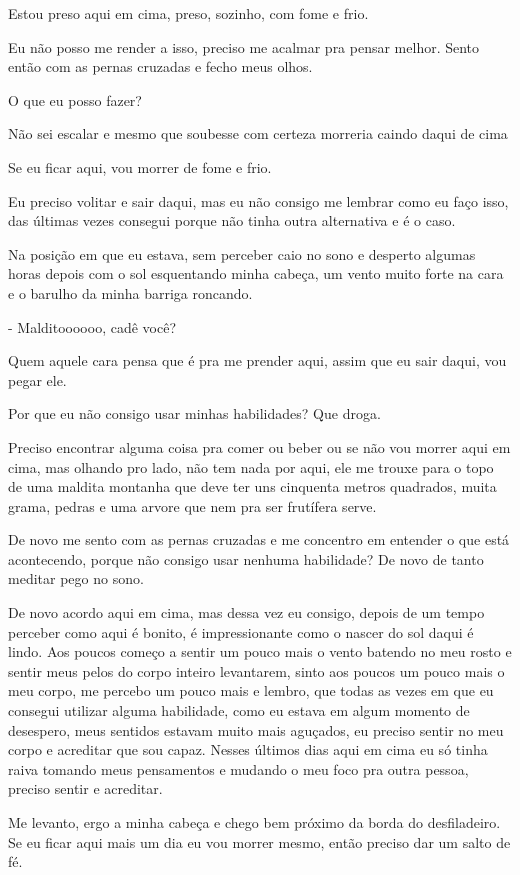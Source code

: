 Estou preso aqui em cima, preso, sozinho, com fome e frio.

Eu não posso me render a isso, preciso me acalmar pra pensar melhor. Sento então com as pernas cruzadas e fecho meus olhos. 

O que eu posso fazer? 

Não sei escalar e mesmo que soubesse com certeza morreria caindo daqui de cima

Se eu ficar aqui, vou morrer de fome e frio.

Eu preciso volitar e sair daqui, mas eu não consigo me lembrar como eu faço isso, das últimas vezes consegui porque não tinha outra alternativa e é o caso.

Na posição em que eu estava, sem perceber caio no sono e desperto algumas horas depois com o sol esquentando minha cabeça, um vento muito forte na cara e o barulho da minha barriga roncando.

- Malditoooooo, cadê você?

Quem aquele cara pensa que é pra me prender aqui, assim que eu sair daqui, vou pegar ele.

Por que eu não consigo usar minhas habilidades? Que droga.

Preciso encontrar alguma coisa pra comer ou beber ou se não vou morrer aqui em cima, mas olhando pro lado, não tem nada por aqui, ele me trouxe para o topo de uma maldita montanha que deve ter uns cinquenta metros quadrados, muita grama, pedras e uma arvore que nem pra ser frutífera serve.

De novo me sento com as pernas cruzadas e me concentro em entender o que está acontecendo, porque não consigo usar nenhuma habilidade? De novo de tanto meditar pego no sono.

De novo acordo aqui em cima, mas dessa vez eu consigo, depois de um tempo perceber como aqui é bonito, é impressionante como o nascer do sol daqui é lindo. Aos poucos começo a sentir um pouco mais o vento batendo no meu rosto e sentir meus pelos do corpo inteiro levantarem, sinto aos poucos um pouco mais o meu corpo, me percebo um pouco mais e lembro, que todas as vezes em que eu consegui utilizar alguma habilidade, como eu estava em algum momento de desespero, meus sentidos estavam muito mais aguçados, eu preciso sentir no meu corpo e acreditar que sou capaz. Nesses últimos dias aqui em cima eu só tinha raiva tomando meus pensamentos e mudando o meu foco pra outra pessoa, preciso sentir e acreditar.

Me levanto, ergo a minha cabeça e chego bem próximo da borda do desfiladeiro. Se eu ficar aqui mais um dia eu vou morrer mesmo, então preciso dar um salto de fé.

